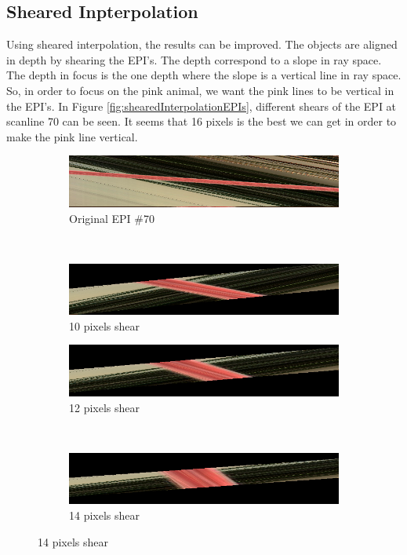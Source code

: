 \documentclass[a4paper]{article}
\begin{document}
\subsection*{Sheared Inpterpolation}
Using sheared interpolation, the results can be improved. The objects are aligned in depth by shearing the EPI's. The depth correspond to a slope in ray space. The depth in focus is the one depth where the slope is a vertical line in ray space. So, in order to focus on the pink animal, we want the pink lines to be vertical in the EPI's. In Figure \ref{fig:shearedInterpolationEPIs}, different shears of the EPI at scanline 70 can be seen. It seems that 16 pixels is the best we can get in order to make the pink line vertical.
\begin{figure}[ht]
	\begin{subfigure}[h]{0.48\textwidth}
	  \includegraphics[width=\textwidth]{shear0}
	  \caption*{Original EPI \#70}
	\end{subfigure}
    	~
	\begin{subfigure}[h]{0.48\textwidth}
	  \centering
	  \includegraphics[width=\textwidth]{shear10}
	  \caption*{10 pixels shear}
	\end{subfigure}
	
	\vspace{2mm}
	\begin{subfigure}[h]{0.48\textwidth}
	  \includegraphics[width=\textwidth]{shear12}
	  \caption*{12 pixels shear}
	\end{subfigure}
    	~
	\begin{subfigure}[h]{0.48\textwidth}
	  \centering
	  \includegraphics[width=\textwidth]{shear14}
	  \caption*{14 pixels shear}
	\end{subfigure}
	

\end{figure}
\end{document}
